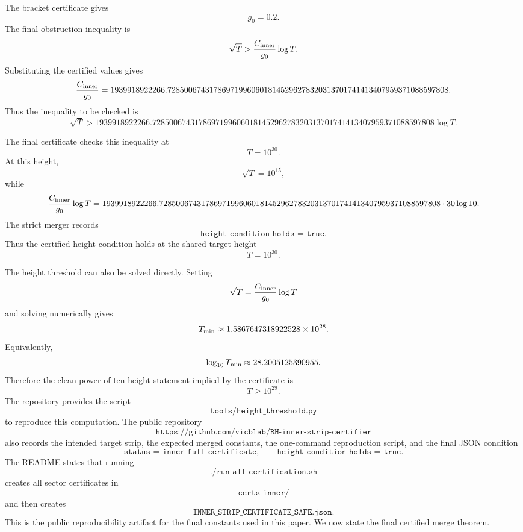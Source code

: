 \documentclass[11pt]{article}
\newcommand{\Cinner}{C_{\rm inner}}
\newcommand{\gzero}{g_0}
\newcommand{\JSON}[1]{\texttt{#1}}
\newcommand{\code}[1]{\texttt{#1}}
\begin{document}
The bracket certificate gives
\[
        \gzero=0.2.
\]
The final obstruction inequality is
\[
        \sqrt T>
        \frac{\Cinner}{\gzero}\log T.
\]
Substituting the certified values gives
\[
        \frac{\Cinner}{\gzero}
        =
        1939918922266.7285006743178697199606018145296278320313701741413407959371088597808.
\]
Thus the inequality to be checked is
\[
        \sqrt T
        >
        1939918922266.7285006743178697199606018145296278320313701741413407959371088597808
        \log T.
\]

The final certificate checks this inequality at
\[
        T=10^{30}.
\]
At this height,
\[
        \sqrt T=10^{15},
\]
while
\[
        \frac{\Cinner}{\gzero}\log T
        =
        1939918922266.7285006743178697199606018145296278320313701741413407959371088597808
        \cdot
        30\log 10.
\]
The strict merger records
\[
        \JSON{height\_condition\_holds = true}.
\]
Thus the certified height condition holds at the shared target height
\[
        T=10^{30}.
\]

The height threshold can also be solved directly.  Setting
\[
        \sqrt T=
        \frac{\Cinner}{\gzero}\log T
\]
and solving numerically gives
\[
        T_{\rm min}
        \approx
        1.5867647318922528\times10^{28}.
\]
Equivalently,
\[
        \log_{10}T_{\rm min}
        \approx
        28.2005125390955.
\]
Therefore the clean power-of-ten height statement implied by the certificate is
\[
        T\ge10^{29}.
\]
The repository provides the script
\[
        \code{tools/height\_threshold.py}
\]
to reproduce this computation.  The public repository
\[
        \texttt{https://github.com/vicblab/RH-inner-strip-certifier}
\]
also records the intended target strip, the expected merged constants, the
one-command reproduction script, and the final JSON condition
\[
        \JSON{status = inner\_full\_certificate},
        \qquad
        \JSON{height\_condition\_holds = true}.
\]
The README states that running
\[
        \code{./run\_all\_certification.sh}
\]
creates all sector certificates in
\[
        \code{certs\_inner/}
\]
and then creates
\[
        \code{INNER\_STRIP\_CERTIFICATE\_SAFE.json}.
\]
This is the public reproducibility artifact for the final constants used in
this paper. \cite{InnerRepo}
We now state the final certified merge theorem.
\end{document}
